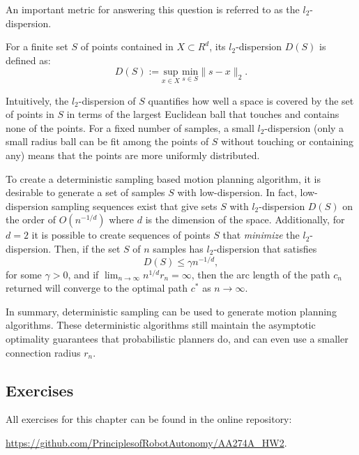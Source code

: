 An important metric for answering this question is referred to as the $l_2$-dispersion. 
\begin{definition}[$l_2$-dispersion]
For a finite set $S$ of points contained in $X \subset R^d$, its $l_2$-dispersion $D(S)$ is defined as:
\begin{equation}
    D(S) := \underset{x\in X}{\text{sup}}\: \underset{ s \in S}{\text{min}} \lVert s - x \rVert_2.
\end{equation}
\end{definition}
Intuitively, the $l_2$-dispersion of $S$ quantifies how well a space is covered by the set of points in $S$ in terms of the largest Euclidean ball that touches and contains none of the points. For a fixed number of samples, a small $l_2$-dispersion (only a small radius ball can be fit among the points of $S$ without touching or containing any) means that the points are more uniformly distributed. 

To create a deterministic sampling based motion planning algorithm, it is desirable to generate a set of samples $S$ with low-dispersion. In fact, low-dispersion sampling sequences exist that give sets $S$ with $l_2$-dispersion $D(S)$ on the order of $O(n^{-1/d})$ where $d$ is the dimension of the space. Additionally, for $d=2$ it is possible to create sequences of points $S$ that \textit{minimize} the $l_2$-dispersion. Then, if the set $S$ of $n$ samples has $l_2$-dispersion that satisfies
\begin{equation*}
    D(S) \leq \gamma n^{-1/d},
\end{equation*}
for some $\gamma > 0$, and if $\lim_{n\rightarrow\infty}n^{1/d}r_n = \infty$, then the arc length of the path $c_n$ returned will converge to the optimal path $c^*$ as $n \xrightarrow{} \infty$.

In summary, deterministic sampling can be used to generate motion planning algorithms. These deterministic algorithms still maintain the asymptotic optimality guarantees that probabilistic planners do, and can even use a smaller connection radius $r_n$.


\subsection{Exercises}
All exercises for this chapter can be found in the online repository:

\vspace{\baselineskip}

\url{https://github.com/PrinciplesofRobotAutonomy/AA274A_HW2}.

